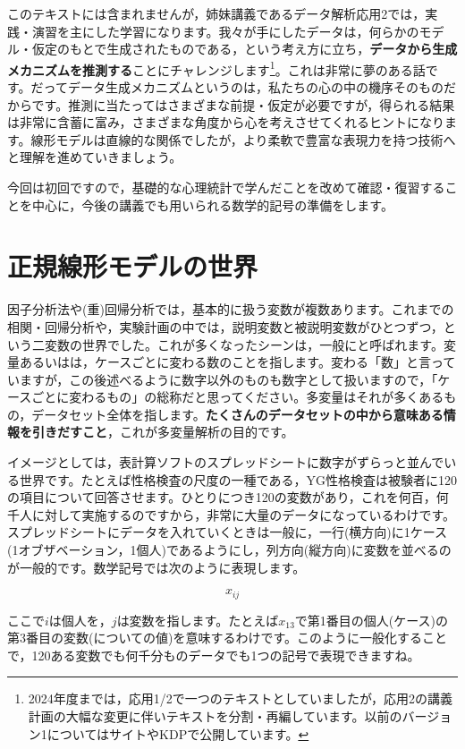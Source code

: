 \documentclass{ltjsbook}
\begin{document}
このテキストには含まれませんが，姉妹講義であるデータ解析応用2では，実践・演習を主にした学習になります。我々が手にしたデータは，何らかのモデル・仮定のもとで生成されたものである，という考え方に立ち，\textbf{データから生成メカニズムを推測する}ことにチャレンジします\footnote{2024年度までは，応用1/2で一つのテキストとしていましたが，応用2の講義計画の大幅な変更に伴いテキストを分割・再編しています。以前のバージョン1についてはサイトやKDPで公開しています。}。これは非常に夢のある話です。だってデータ生成メカニズムというのは，私たちの心の中の機序そのものだからです。推測に当たってはさまざまな前提・仮定が必要ですが，得られる結果は非常に含蓄に富み，さまざまな角度から心を考えさせてくれるヒントになります。線形モデルは直線的な関係でしたが，より柔軟で豊富な表現力を持つ技術へと理解を進めていきましょう。

今回は初回ですので，基礎的な心理統計で学んだことを改めて確認・復習することを中心に，今後の講義でも用いられる数学的記号の準備をします。

\section{正規線形モデルの世界}

因子分析法や(重)回帰分析では，基本的に扱う変数が複数あります。これまでの相関・回帰分析や，実験計画の中では，説明変数と被説明変数がひとつずつ，という二変数の世界でした。これが多くなったシーンは，一般にと呼ばれます。変量あるいはは，ケースごとに変わる数のことを指します。変わる「数」と言っていますが，この後述べるように数字以外のものも数字として扱いますので，「ケースごとに変わるもの」の総称だと思ってください。多変量はそれが多くあるもの，データセット全体を指します。\textbf{たくさんのデータセットの中から意味ある情報を引きだすこと}，これが多変量解析の目的です。

イメージとしては，表計算ソフトのスプレッドシートに数字がずらっと並んでいる世界です。たとえば性格検査の尺度の一種である，YG性格検査は被験者に120の項目について回答させます。ひとりにつき120の変数があり，これを何百，何千人に対して実施するのですから，非常に大量のデータになっているわけです。スプレッドシートにデータを入れていくときは一般に，一行(横方向)に1ケース(1オブザベーション，1個人)であるようにし，列方向(縦方向)に変数を並べるのが一般的です。数学記号では次のように表現します。

\[ x_{ij }\]

ここで$i$は個人を，$j$は変数を指します。たとえば$x_{13}$で第1番目の個人(ケース)の第3番目の変数(についての値)を意味するわけです。このように一般化することで，120ある変数でも何千分ものデータでも1つの記号で表現できますね。
\end{document}
